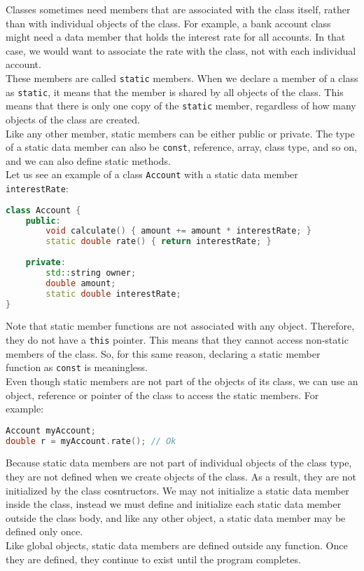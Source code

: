 Classes sometimes need members that are associated with the class itself, rather than with individual
objects of the class. For example, a bank account class might need a data member that holds the interest
rate for all accounts. In that case, we would want to associate the rate with the class, not with each 
individual account.\\

These members are called \texttt{static} members. When we declare a member of a class as \texttt{static},
it means that the member is shared by all objects of the class. This means that there is only one copy
of the \texttt{static} member, regardless of how many objects of the class are created.\\

Like any other member, static members can be either public or private. The type of a static data member
can also be \texttt{const}, reference, array, class type, and so on, and we can also define static methods.\\

Let us see an example of a class \texttt{Account} with a static data member \texttt{interestRate}:\\

\begin{lstlisting}[language=C++]
class Account {
    public:
        void calculate() { amount += amount * interestRate; }
        static double rate() { return interestRate; }
        
    private:
        std::string owner;
        double amount;
        static double interestRate;
}
\end{lstlisting}

Note that static member functions are not associated with any object. Therefore, they do not have a
\texttt{this} pointer. This means that they cannot access non-static members of the class. So, for 
this same reason, declaring a static member function as \texttt{const} is meaningless.\\

Even though static members are not part of the objects of its class, we can use an object, reference or pointer
of the class to access the static members. For example:\\

\begin{lstlisting}[language=C++]
Account myAccount;
double r = myAccount.rate(); // Ok
\end{lstlisting}

Because static data members are not part of individual objects of the class type, they are not defined
when we create objects of the class. As a result, they are not initialized by the class cosntructors.
We may not initialize a static data member inside the class, instead we must define and initialize each
static data member outside the class body, and like any other object, a static data member may be 
defined only once.\\

Like global objects, static data members are defined outside any function. Once they are defined, they
continue to exist until the program completes.


